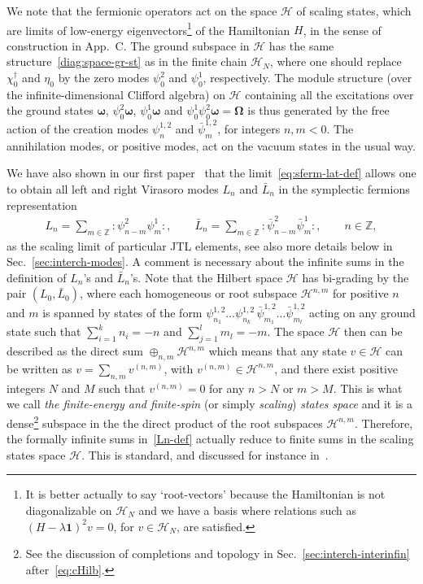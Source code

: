 \documentclass[11pt]{article}
\newcommand{\one}{\boldsymbol{1}}%
\newcommand{\sferm}{\psi}
\newcommand{\bsferm}{\bar{\psi}}
\newcommand{\sfermp}{\psi^{2}}
\newcommand{\sfermm}{\psi^{1}}
\newcommand{\bsfermp}{\bar{\psi}^{2}}
\newcommand{\bsfermm}{\bar{\psi}^{1}}
\newcommand{\Hilb}{\mathcal{H}}
\newcommand{\vac}{\boldsymbol{\Omega}}
\newcommand{\lvac}{\boldsymbol{\omega}}
\newcommand{\oZ}{\mathbb{Z}}
\newcommand{\AppLim}{C}
\newcommand{\nord}[1]{\boldsymbol{\colon}\!\!{#1}\boldsymbol{\colon}\!\!}
\theoremstyle{definition}
\begin{document}
We note that the fermionic operators act on the  space $\Hilb$ of scaling states, which are limits of low-energy eigenvectors\footnote{It is better actually to say `root-vectors' because the Hamiltonian is not diagonalizable on $\Hilb_N$ and we have a basis where  relations such as $(H-\lambda\one)^2 v = 0$, for $v\in\Hilb_{N}$, are satisfied.} of the Hamiltonian $H$, in the sense of construction in App.~\AppLim. The ground subspace in $\Hilb$ has the same structure~\eqref{diag:space-gr-st} as in the finite chain $\Hilb_{N}$, where one should replace $\chi_0^{\dagger}$ and $\eta_0$
by the zero modes $\sfermp_0$ and $\sfermm_0$, respectively.
 The module structure (over the infinite-dimensional Clifford algebra) on $\Hilb$  containing all the excitations over the ground states
$\lvac$, $\sfermp_0\lvac$, $\sfermm_0\lvac$ and $\sfermm_0\sfermp_0\lvac=\vac$ is thus generated by the free action of the
creation modes $\sferm^{1,2}_n$ and $\bsferm^{1,2}_m$, for integers $n,m<0$.
The annihilation modes, or positive modes, act on the vacuum states in the usual way.

We have also shown in our first paper~\cite{GRS1} that the limit~\eqref{eq:sferm-lat-def} allows one to obtain all left and right Virasoro modes $L_n$ and $\bar{L}_n$ in the symplectic fermions representation
\begin{eqnarray}\label{Ln-def}
L_n=\sum_{m\in\oZ} \nord{\sfermp_{n-m}\sfermm_m},\qquad
\bar{L}_n=\sum_{m\in\oZ} \nord{\bsfermp_{n-m}\bsfermm_m},\qquad n\in\oZ,
\end{eqnarray}
 as the scaling limit of particular JTL elements, see also more details below in  Sec.~\ref{sec:interch-modes}. A comment is necessary about the infinite sums in the definition of $L_n$'s and $\bar{L}_n$'s. Note that the Hilbert space $\Hilb$ has bi-grading by the pair $(L_0,\bar{L}_0)$, where each homogeneous or root subspace $\Hilb^{n,m}$ for positive $n$ and $m$ is spanned by states of the form $\sferm^{1,2}_{n_1}\dots\sferm^{1,2}_{n_k}\,\bsferm^{1,2}_{m_1}\dots\bsferm^{1,2}_{m_l}$ acting on any ground state such that $\sum_{i=1}^k n_i = -n$ and $\sum_{j=1}^{l}m_l = -m$. The space $\Hilb$ then can be described as the direct sum $\oplus_{n,m}\Hilb^{n,m}$ which means that any state $v\in\Hilb$ can be written as $v=\sum_{n,m}v^{(n,m)}$, with $v^{(n,m)}\in\Hilb^{n,m}$, and there exist positive integers $N$ and $M$ such that $v^{(n,m)}=0$ for any $n>N$ or $m>M$. This is what we call \textit{the finite-energy and finite-spin} (or simply \textit{scaling}) \textit{states space} and it is
 a dense\footnote{See the discussion of completions and topology in Sec.~\ref{sec:interch-interinfin} after~\eqref{eq:cHilb}.} subspace in the the direct product of the root subspaces $\Hilb^{n,m}$.
 Therefore, the formally infinite sums in~\eqref{Ln-def}  actually  reduce to finite sums in the scaling states space $\Hilb$.
  This is standard, and discussed for instance in~\cite{Ottesen}.
\end{document}
